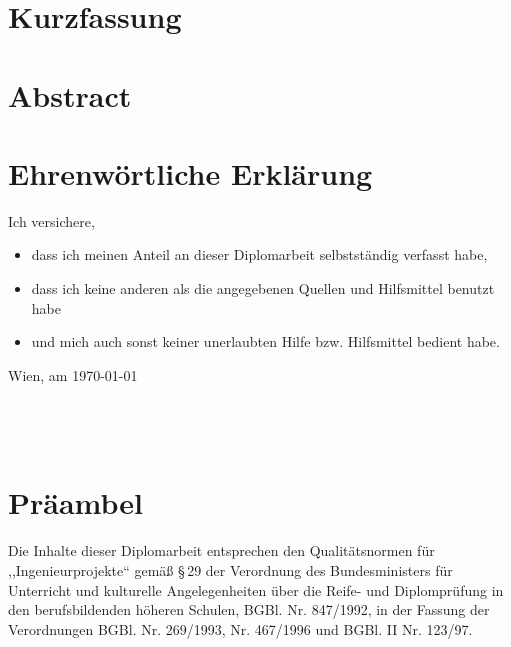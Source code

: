 \documentclass[a4paper,ngerman,naustrian,DIV=12,BCOR=1cm]{scrbook}
\begin{document}
\chapter*{Kurzfassung}

\thispagestyle{fancy}




\chapter*{Abstract}

\thispagestyle{fancy}




\chapter*{Ehrenwörtliche Erklärung}

\thispagestyle{fancy}

Ich versichere,
\begin{itemize}
\item dass ich meinen Anteil an dieser Diplomarbeit selbstständig verfasst
habe,
\item dass ich keine anderen als die angegebenen Quellen und Hilfsmittel
benutzt habe
\item und mich auch sonst keiner unerlaubten Hilfe bzw. Hilfsmittel bedient
habe.
\end{itemize}
\bigskip{}
Wien, am \today
\\
\\
\\
\\


\chapter*{Präambel}

\thispagestyle{fancy}

Die Inhalte dieser Diplomarbeit entsprechen den Qualitätsnormen für
,,Ingenieurprojekte`` gemäß §\,29 der Verordnung des Bundesministers
für Unterricht und kulturelle Angelegenheiten über die Reife- und
Diplomprüfung in den berufsbildenden höheren Schulen, BGBl. Nr. 847/1992,
in der Fassung der Verordnungen BGBl. Nr. 269/1993, Nr. 467/1996 und
BGBl. II Nr. 123/97.
\end{document}
